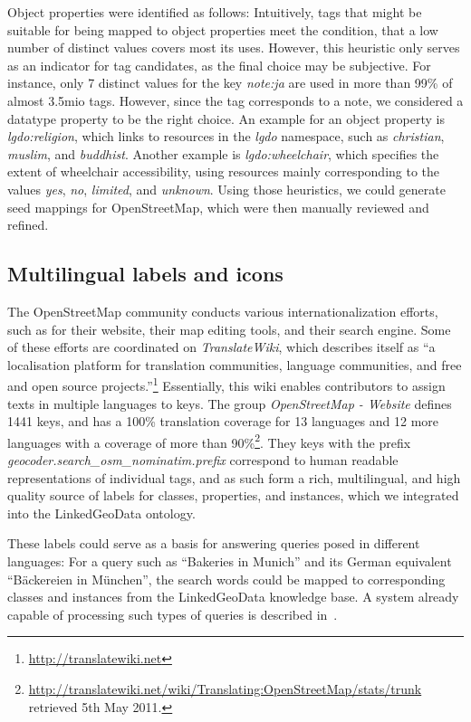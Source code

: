 Object properties were identified as follows:
Intuitively, tags that might be suitable for being mapped to object properties meet the condition, that a low number of distinct values covers most its uses. 
However, this heuristic only serves as an indicator for tag candidates, as the final choice may be subjective.
For instance, only 7 distinct values for the key \emph{note:ja} are used in more than 99\% of almost 3.5mio tags. 
However, since the tag corresponds to a note, we considered a datatype property to be the right choice.
An example for an object property is \emph{lgdo:religion}, which links to
resources in the \emph{lgdo} namespace, such as \emph{christian}, \emph{muslim},
and \emph{buddhist}.
Another example is \emph{lgdo:wheelchair}, which specifies the extent of
wheelchair accessibility, using resources mainly corresponding to the
values \emph{yes}, \emph{no}, \emph{limited}, and \emph{unknown}.
Using those heuristics, we could generate seed mappings for OpenStreetMap, which were then manually reviewed and refined.


\subsection{Multilingual labels and icons}
The OpenStreetMap community conducts various internationalization efforts, such as for
their website, their map editing tools, and their search engine.
Some of these efforts are coordinated on \emph{TranslateWiki}, which describes
itself as ``a localisation platform for translation communities, language
communities, and free and open source
projects.''\footnote{\url{http://translatewiki.net}} Essentially, this wiki
enables contributors to assign texts in multiple languages to keys.
The group \emph{OpenStreetMap - Website} defines 1441 keys, and has a 100\%
translation coverage for 13 languages and 12 more languages with a coverage of
more than 90\%\footnote{\url{http://translatewiki.net/wiki/Translating:OpenStreetMap/stats/trunk} retrieved 5th May 2011.}.
They keys with the prefix \emph{geocoder.search\_osm\_nominatim.prefix}
correspond to human readable representations of individual tags, and as such
form a rich, multilingual, and high quality source of labels for classes,
properties, and instances, which we integrated into the LinkedGeoData ontology.

These labels could serve as a basis for answering queries posed in different
languages: For a query such as ``Bakeries in Munich'' and its German
equivalent ``B\"{a}ckereien in M\"{u}nchen'', the search words could be mapped
to corresponding classes and instances from the LinkedGeoData knowledge
base.
A system already capable of processing such types of queries is described
in~\cite{spirit}.


